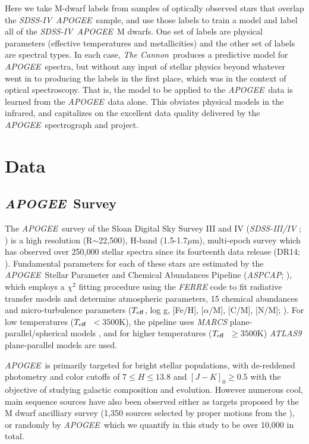 \documentclass[modern]{aastex62}
\newcommand{\apogee}{\textsl{APOGEE}}
\newcommand{\thecannon}{\textsl{The Cannon}}
\newcommand{\aspcap}{\textsl{ASPCAP}}
\newcommand{\sdssiv}{\textsl{SDSS-IV}}
\newcommand{\teff}{$T_{\rm eff}$}
\begin{document}
Here we take M-dwarf labels from samples of optically observed stars that overlap the
\sdssiv\ \apogee\ sample, and use those labels to train a model and label all of the
\sdssiv\ \apogee\ M dwarfs.
One set of labels are physical parameters (effective temperatures and metallicities)
and the other set of labels are spectral types.
In each case, \thecannon\ produces a predictive model for \apogee\ spectra, but without
any input of stellar physics beyond whatever went in to producing the labels in the first
place, which was in the context of optical spectroscopy.
That is, the model to be applied to the \apogee\ data is learned from the \apogee\ data alone.
This obviates physical models in the infrared, and capitalizes on the excellent data quality
delivered by the \apogee\ spectrograph and project.

\section{Data} \label{sec:data}

\subsection{\apogee\ Survey}

The \apogee\ survey \citep{Majewski:2015} of the Sloan Digital Sky Survey III and IV (\textsl{SDSS-III/IV} \citealt{Eisenstein:2011}; \citealt{Blanton:2017}) is a high resolution (R$\sim$22,500), H-band (1.5-1.7$\mu$m), multi-epoch survey which has observed over 250,000 stellar spectra since its fourteenth data release (DR14; \citealt{Abolfathi:2017}). Fundamental parameters for each of these stars are estimated by the \apogee\ Stellar Parameter and Chemical Abundances Pipeline (\aspcap; \citealt{Perez:2016}), which employs a $\chi^2$ fitting procedure using the \textsl{FERRE} code to fit radiative transfer models and determine atmospheric parameters, 15 chemical abundances and micro-turbulence parameters (\teff, log g, [Fe/H], [$\alpha$/M], [C/M], [N/M]; \citealt{Meszaros:2012}). For low temperatures (\teff\ $<3500$K), the pipeline uses \textsl{MARCS} plane-parallel/spherical models \citep{Gustafsson:2008}, and for higher temperatures (\teff\ $\geq3500$K) \textsl{ATLAS9} \citep{Castelli:2004} plane-parallel models are used.

\apogee\ is primarily targeted for bright stellar populations, with de-reddened photometry and color cutoffs of $7 \leq H \leq 13.8$ and $[J-K]_0 \geq 0.5$ \citep{Zasowski:2013} with the objective of studying galactic composition and evolution. However numerous cool, main sequence sources have also been observed either as targets proposed by the M dwarf ancilliary survey (1,350 sources selected by proper motions from the  \citealt{Desphande:2013}), or randomly by \apogee\, which we quantify in this study to be over 10,000 in total.
\end{document}
